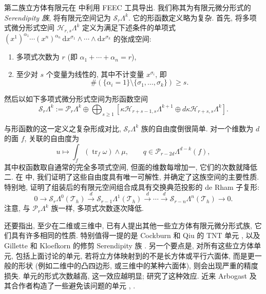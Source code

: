 第二族立方体有限元在  中利用 FEEC 工具导出. 我们称其为有限元微分形式的\emph{Serendipity 族}, 将有限元空间记为 $\mathcal S_r\Lambda^k$. 它的形函数定义略为复杂. 首先, 将多项式微分形式空间 $\mathcal H_{r,s}\Lambda^k$ 定义为满足下述条件的单项式 $(x^1)^{\alpha_1}\cdots(x^n)^{\alpha_n}\,\mathrm{d}x^{\sigma_1}\wedge\cdots\wedge \mathrm{d}x^{\sigma_k}$ 的张成空间:
\begin{enumerate}
\item{多项式次数为 $r$ (即 $\alpha_1+\cdots+\alpha_n=r$),}
\item{至少对 $s$ 个变量为线性的, 其中不计变量 $x^{\sigma_i}$, 即}
\[
\#(\{\alpha_i=1\}\setminus\{\sigma_1,\ldots,\sigma_k\})\geq s.
\]
\end{enumerate}
然后以如下多项式微分形式空间为形函数空间
\[
\mathcal S_r\Lambda^k:=\mathcal P_r\Lambda^k\oplus\bigoplus_{s\geq1}[\kappa\mathcal H_{r+s-1,s}\Lambda^{k+1}\oplus d\kappa\mathcal H_{r+s,s}\Lambda^k].
\]

与形函数的这一定义之复杂形成对比, $\mathcal S_r\Lambda^k$ 族的自由度倒很简单. 对一个维数为 $d$ 的面 $f$, 关联的自由度为
\[
u\mapsto\int_f(\operatorname{tr}_f\omega)\wedge\mu,\qquad q\in\mathcal P_{r-2d}\Lambda^{d-k}(f),
\]
其中权函数取自通常的完全多项式空间, 但面的维数每增加一, 它们的次数就降低二. 在  中, 我们证明了这些自由度具有唯一可解性, 并确定了这族空间的主要性质. 特别地, 证明了组装后的有限元空间组合成具有交换典范投影的 de Rham 子复形:
\[
0\to\mathcal S_r\Lambda^0(\mathcal T_h)\xrightarrow{d}\mathcal S_{r-1}\Lambda^1(\mathcal T_h)\xrightarrow{d}\cdots\xrightarrow{d}\mathcal S_{r-n}\Lambda^n(\mathcal T_h)\to0.
\]
注意, 与 $\mathcal P_r\Lambda^k$ 族一样, 多项式次数逐次降低.

还要指出, 至少在二维或三维中, 已有人提出其他一些立方体有限元微分形式族, 它们具有许多相同的性质. 特别值得一提的是 Cockburn 和 Qiu 的 TNT 单元 , 以及 Gillette 和 Kloefkorn 的修剪 Serendipity 族 . 另一个要点是, 对所有这些立方体单元, 包括上面讨论的单元, 若将立方体映射到的不是长方体或平行六面体, 而是更一般的形状 (例如二维中的凸四边形, 或三维中的某种六面体), 则会出现严重的精度损失. 单元的形式次数越高, 这一效应越明显;  研究了这种效应. 近来 Arbogast 及其合作者构造了一些避免该问题的单元 , .
